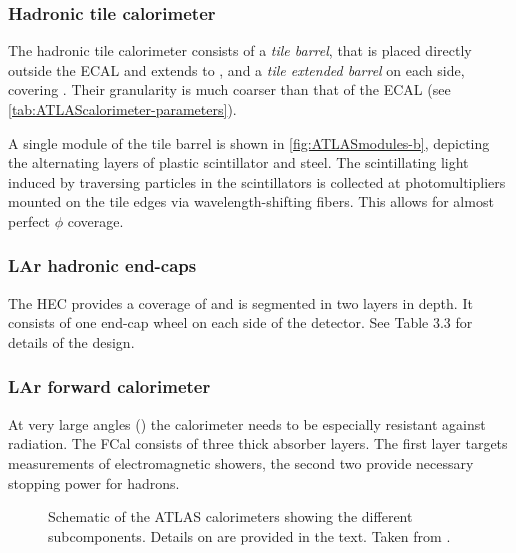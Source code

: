 \subsubsection{Hadronic tile calorimeter}
The hadronic tile calorimeter consists of a \emph{tile barrel}, that is placed directly outside the ECAL and extends to , and a \emph{tile extended barrel} on each side, covering .
Their granularity is much coarser than that of the ECAL (see \cref{tab:ATLAScalorimeter-parameters}).

A single module of the tile barrel is shown in \cref{fig:ATLASmodules-b}, depicting the alternating layers of plastic scintillator and steel. The scintillating light induced by traversing particles in the scintillators is collected at photomultipliers mounted on the tile edges via wavelength-shifting fibers. This allows for almost perfect $\phi$ coverage.

\subsubsection{LAr hadronic end-caps}
The HEC provides a coverage of  and is segmented in two layers in depth. It consists of one end-cap wheel on each side of the detector. See Table 3.3 for details of the design.

\subsubsection{LAr forward calorimeter}
At very large angles () the calorimeter needs to be especially resistant against radiation. The FCal consists of three thick absorber layers. The first layer targets measurements of electromagnetic showers, the second two provide necessary stopping power for hadrons.




\begin{figure}
    \caption[Schematic of the ATLAS calorimeters showing the different subcomponents.]{Schematic of the ATLAS calorimeters showing the different subcomponents. Details on are provided in the text. Taken from .}
    \label{fig:ATLAScalorimeters}
\end{figure}

